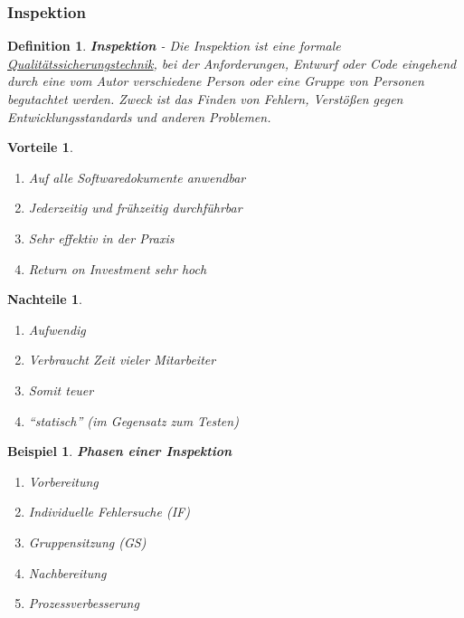 \documentclass[a4paper]{article}
\theoremstyle{break}
\newtheorem{defi}{Definition}[section]
\newtheorem{ex}{Beispiel}[section]
\newtheorem{why}{Vorteile}[section]
\newtheorem{whynot}{Nachteile}[section]
\begin{document}
        \subsubsection{Inspektion}
        \begin{defi}
          \textbf{Inspektion} - Die Inspektion ist eine formale \ul{Qualit\"atssicherungstechnik}, bei der Anforderungen, Entwurf oder Code eingehend durch eine vom Autor verschiedene Person oder eine Gruppe von Personen begutachtet werden. Zweck ist das Finden von Fehlern, Verst\"oßen gegen Entwicklungsstandards und anderen Problemen.
        \end{defi}

        \begin{why}
          \begin{enumerate}
          \item Auf alle Softwaredokumente anwendbar
          \item Jederzeitig und fr\"uhzeitig durchf\"uhrbar
          \item Sehr effektiv in der Praxis
          \item Return on Investment sehr hoch
          \end{enumerate}
        \end{why}
        \begin{whynot}
          \begin{enumerate}
          \item Aufwendig
          \item Verbraucht Zeit vieler Mitarbeiter
          \item Somit teuer
          \item ``statisch'' (im Gegensatz zum Testen)
          \end{enumerate}
        \end{whynot}

        \begin{ex}
          \textbf{Phasen einer Inspektion}
        \begin{enumerate}
        \item Vorbereitung
        \item Individuelle Fehlersuche (IF)
        \item Gruppensitzung (GS)
        \item Nachbereitung
        \item Prozessverbesserung
        \end{enumerate}
        \end{ex}
\end{document}
